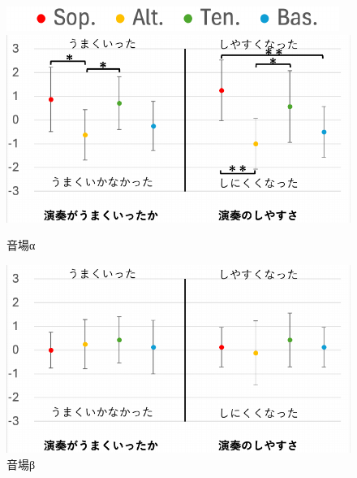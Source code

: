 \documentclass[11pt,a4j]{jreport}
\begin{document}
\begin{figure}[H]
  \centering
  
  \begin{minipage}{1\linewidth}
    \centering
    \includegraphics[scale=.55]{images/subjectiveExp/statisticAnalysis/part_legend.pdf}
  \end{minipage}

  \vspace{.5\baselineskip}

  \begin{minipage}{.5\linewidth}
    \centering
    \includegraphics[scale=.55]{images/subjectiveExp/statisticAnalysis/part_overall_a.pdf}
    \caption*{音場α}
    \label{fig:総合的な評価α}
  \end{minipage}%
  \begin{minipage}{.5\linewidth}
    \centering
    \includegraphics[scale=.55]{images/subjectiveExp/statisticAnalysis/part_overall_b.pdf}
    \caption*{音場β}
    \label{fig:総合的な評価β}
  \end{minipage}


\end{figure}
\end{document}
